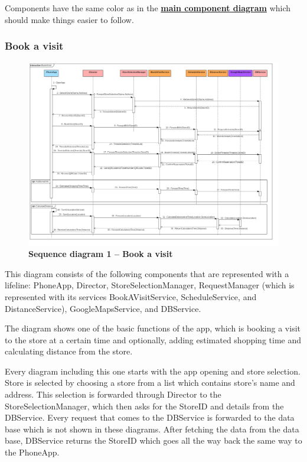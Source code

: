  
Components have the same color as in the  \textbf{\hyperref[fig:componentdiagram1]{main component diagram}} which should make things easier to follow.  

\subsubsection{Book a visit}


\begin{figure}[!h]
\centering
\includegraphics[width=\textwidth]{Images/SequenceDiagramComponents1_BookAVisit}
\caption{\label{fig:seqdiagram1}\textbf{Sequence diagram 1 – Book a visit}}
\end{figure}
\newpage

This diagram consists of the following components that are represented with a lifeline: PhoneApp, Director, StoreSelectionManager, RequestManager (which is represented with its services BookAVisitService, ScheduleService, and DistanceService), GoogleMapsService, and DBService.  

  

The diagram shows one of the basic functions of the app, which is booking a visit to the store at a certain time and optionally, adding estimated shopping time and calculating distance from the store.  

  

Every diagram including this one starts with the app opening and store selection. Store is selected by choosing a store from a list which contains store's name and address. This selection is forwarded through Director to the StoreSelectionManager, which then asks for the StoreID and details from the DBService. Every request that comes to the DBService is forwarded to the data base which is not shown in these diagrams. After fetching the data from the data base, DBService returns the StoreID which goes all the way back the same way to the PhoneApp.   

